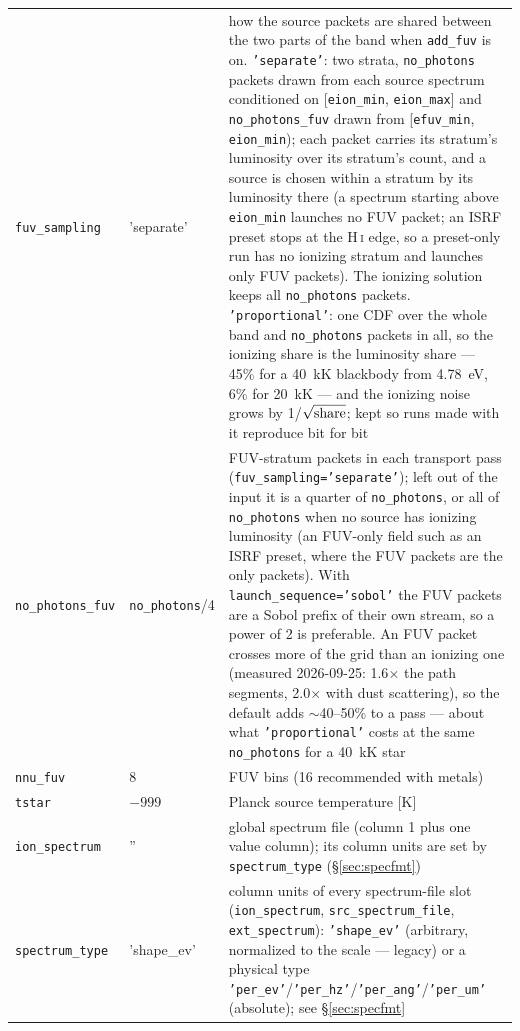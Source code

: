 \documentclass[english,a4paper]{my_memo}
\newcommand{\code}[1]{\texttt{#1}}
\begin{document}
{\begin{longtable}{llp{7.2cm}}
\code{fuv\_sampling} & 'separate' & how the source packets are shared between the two parts of the band when \code{add\_fuv} is on.  \code{'separate'}: two strata, \code{no\_photons} packets drawn from each source spectrum conditioned on [\code{eion\_min}, \code{eion\_max}] and \code{no\_photons\_fuv} drawn from [\code{efuv\_min}, \code{eion\_min}); each packet carries its stratum's luminosity over its stratum's count, and a source is chosen within a stratum by its luminosity there (a spectrum starting above \code{eion\_min} launches no FUV packet; an ISRF preset stops at the H\,\textsc{i} edge, so a preset-only run has no ionizing stratum and launches only FUV packets).  The ionizing solution keeps all \code{no\_photons} packets.  \code{'proportional'}: one CDF over the whole band and \code{no\_photons} packets in all, so the ionizing share is the luminosity share --- 45\% for a 40~kK blackbody from 4.78~eV, 6\% for 20~kK --- and the ionizing noise grows by 1/$\sqrt{\rm share}$; kept so runs made with it reproduce bit for bit \\
\code{no\_photons\_fuv} & \code{no\_photons}/4 & FUV-stratum packets in each transport pass (\code{fuv\_sampling='separate'}); left out of the input it is a quarter of \code{no\_photons}, or all of \code{no\_photons} when no source has ionizing luminosity (an FUV-only field such as an ISRF preset, where the FUV packets are the only packets).  With \code{launch\_sequence='sobol'} the FUV packets are a Sobol prefix of their own stream, so a power of 2 is preferable.  An FUV packet crosses more of the grid than an ionizing one (measured 2026-09-25: 1.6$\times$ the path segments, 2.0$\times$ with dust scattering), so the default adds $\sim$40--50\% to a pass --- about what \code{'proportional'} costs at the same \code{no\_photons} for a 40~kK star \\
\code{nnu\_fuv} & 8 & FUV bins (16 recommended with metals) \\
\code{tstar} & $-999$ & Planck source temperature [K] \\
\code{ion\_spectrum} & '' & global spectrum file (column 1 plus one value column); its column units are set by \code{spectrum\_type} (\S\ref{sec:specfmt}) \\
\code{spectrum\_type} & 'shape\_ev' & column units of every spectrum-file slot (\code{ion\_spectrum}, \code{src\_spectrum\_file}, \code{ext\_spectrum}): \code{'shape\_ev'} (arbitrary, normalized to the scale --- legacy) or a physical type \code{'per\_ev'}/\code{'per\_hz'}/\code{'per\_ang'}/\code{'per\_um'} (absolute); see \S\ref{sec:specfmt} \\

\end{longtable}}
\end{document}
